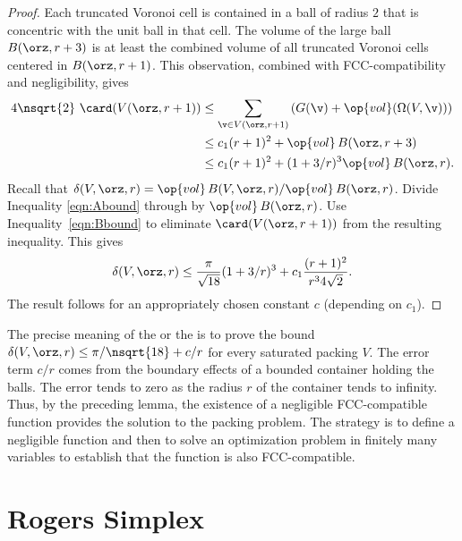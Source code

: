 \begin{cnl}
\begin{proof}
Each truncated Voronoi cell is contained in a ball of radius $2$ that
is concentric with the unit ball in that cell.  The volume of the
large ball $\openBall{\orz}{r+3}$ is at least the combined volume of all
truncated Voronoi cells centered in $\openBall{\orz}{r+1}$. This observation,
combined with FCC-compatibility and negligibility, gives
\begin{equation} 
\begin{split} 
4\nsqrt{2}\,\,\card( \Vee{V}(\orz,r+1))
&\le \sumfinitepred{\v}{\v\in \Vee{V}(\orz,r+1)}{\left(G(\v) +
\op{vol}(\Omega(V,\v))\right)} \\
&\le c_1 (r+1)^2 + \op{vol}\,\openBall{\orz}{r+3} \\
&\le c_1 (r+1)^2 + (1+3/r)^3 \op{vol}\,\openBall{\orz}{r}.
\label{eqn:Bbound}
\end{split}
\end{equation}
%
Recall that $\delta( V,\orz,r)=
\op{vol}\,\openBall{ V}{\orz,r}/\op{vol}\,\openBall{\orz}{r}$. Divide Inequality
\ref{eqn:Abound} through by $\op{vol}\,\openBall{\orz}{r}$.  Use
Inequality~\ref{eqn:Bbound} to eliminate $\card( \Vee{V}(\orz,r+1))$ from the
resulting inequality.  This gives
\[ \delta( V,\orz,r)
\le \frac{\pi}{\sqrt{18}} (1+3/r)^3 + c_1 \frac{(r+1)^2}{r^34\sqrt{2}}.
\] 
The result follows for an appropriately chosen constant $c$
(depending on $c_1$).
\end{proof}


\begin{remark}
\label{remark:precise} 
The precise meaning of the  or the
 is to prove the bound $\delta(
V,\orz,r) \le \pi/\nsqrt{18} + c/r$ for every saturated packing $ V$.
The error term $c/r$ comes from the boundary effects of a bounded
container holding the balls.  The error tends to zero as the radius
$r$ of the container tends to infinity.  Thus, by the preceding lemma,
the existence of a negligible FCC-compatible function provides the
solution to the packing problem.  The strategy is to define a
negligible function and then to solve an optimization problem in
finitely many variables to establish that the function is also
FCC-compatible.
\end{remark}


\section{Rogers Simplex}\label{sec:rogers}


\end{cnl}
